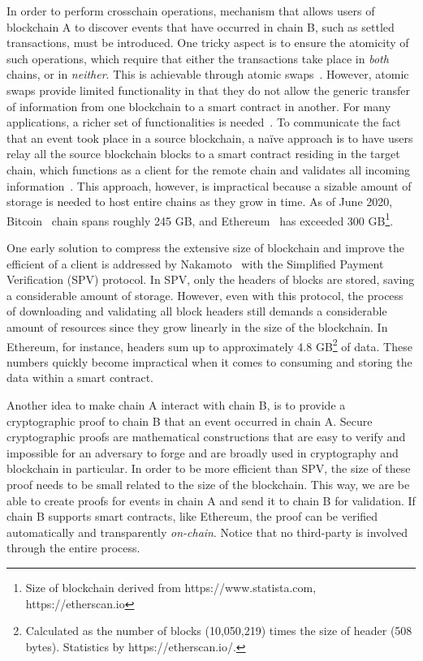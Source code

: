 In order to perform crosschain operations, mechanism that allows users of
blockchain A to discover events that have occurred in chain B, such as settled
transactions, must be introduced. One tricky aspect is to ensure the atomicity
of such operations, which require that either the transactions take place in
\emph{both} chains, or in \emph{neither}.  This is achievable through atomic
swaps~\cite{tiernolan,herlihy2018atomic}.  However, atomic swaps provide
limited functionality in that they do not allow the generic transfer of
information from one blockchain to a smart contract in another. For many
applications, a richer set of functionalities is
needed~\cite{pow-sidechains,derivatives}.  To communicate the fact that an
event took place in a source blockchain, a na\"ive approach is to have users
relay all the source blockchain blocks to a smart contract residing in the
target chain, which functions as a client for the remote chain and validates
all incoming information~\cite{btcrelay}.  This approach, however, is
impractical because a sizable amount of storage is needed to host entire chains
as they grow in time. As of June 2020, Bitcoin~\cite{nakamoto} chain spans
roughly 245 GB, and Ethereum~\cite{wood, buterin} has exceeded 300
GB\footnote{Size of blockchain derived from https://www.statista.com,
https://etherscan.io}.

One early solution to compress the extensive size of blockchain and improve the
efficient of a client is addressed by
Nakamoto~\cite{nakamoto} with the Simplified Payment Verification (SPV)
protocol. In SPV, only the headers of blocks are stored, saving a considerable
amount of storage.  However, even with this protocol, the process of
downloading and validating all block headers still demands a considerable
amount of resources since they grow linearly in the size of the blockchain.
In Ethereum, for instance, headers sum up to approximately 4.8
GB\footnote{Calculated as the number of blocks (10,050,219) times the size of
header (508 bytes). Statistics by https://etherscan.io/.} of data.
These numbers quickly become impractical when it comes to consuming and storing the
data within a smart contract.


Another idea to make chain A interact with chain B, is to provide a
cryptographic proof to chain B that an event occurred in chain A. Secure
cryptographic proofs are mathematical constructions that are easy to verify and
impossible for an adversary to forge and are broadly used in cryptography and
blockchain in particular. In order to be more efficient than SPV, the size of
these proof needs to be small related to the size of the blockchain. This way,
we are be able to create proofs for events in chain A and send it to chain B
for validation. If chain B supports smart contracts, like Ethereum, the proof
can be verified automatically and transparently \emph{on-chain}. Notice that no
third-party is involved through the entire process.

